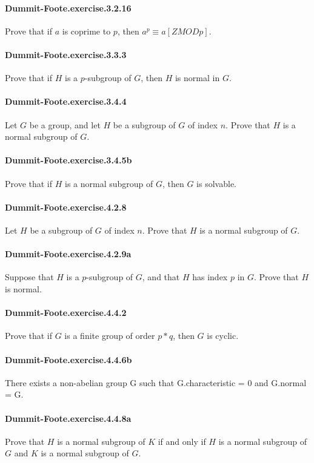 \documentclass{article}
\begin{document}
\paragraph{Dummit-Foote.exercise.3.2.16} Prove that if $a$ is coprime to $p$, then $a^p \equiv a [ZMOD p]$.

\paragraph{Dummit-Foote.exercise.3.3.3} Prove that if $H$ is a $p$-subgroup of $G$, then $H$ is normal in $G$.

\paragraph{Dummit-Foote.exercise.3.4.4} Let $G$ be a group, and let $H$ be a subgroup of $G$ of index $n$. Prove that $H$ is a normal subgroup of $G$.

\paragraph{Dummit-Foote.exercise.3.4.5b} Prove that if $H$ is a normal subgroup of $G$, then $G$ is solvable.

\paragraph{Dummit-Foote.exercise.4.2.8} Let $H$ be a subgroup of $G$ of index $n$. Prove that $H$ is a normal subgroup of $G$.

\paragraph{Dummit-Foote.exercise.4.2.9a} Suppose that $H$ is a $p$-subgroup of $G$, and that $H$ has index $p$ in $G$. Prove that $H$ is normal.

\paragraph{Dummit-Foote.exercise.4.4.2} Prove that if $G$ is a finite group of order $p*q$, then $G$ is cyclic.

\paragraph{Dummit-Foote.exercise.4.4.6b} There exists a non-abelian group G such that G.characteristic = 0 and G.normal = G.

\paragraph{Dummit-Foote.exercise.4.4.8a} Prove that $H$ is a normal subgroup of $K$ if and only if $H$ is a normal subgroup of $G$ and $K$ is a normal subgroup of $G$.
\end{document}

